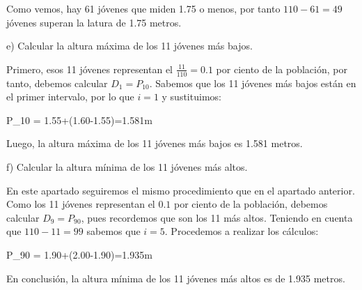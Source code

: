 Como vemos, hay 61 jóvenes que miden 1.75 o menos, por tanto $110-61=49$ jóvenes superan la latura de 1.75 metros.

e) Calcular la altura máxima de los 11 jóvenes más bajos.

Primero, esos 11 jóvenes representan el $\frac{11}{110}=0.1$ por ciento de la población, por tanto, debemos calcular $D_{1} = P_{10}$. Sabemos que los 11 jóvenes más bajos están en el primer intervalo, por lo que $i=1$ y sustituimos:

\begin{center}
    \begin{*gather}
        P_{10} = 1.55+(1.60-1.55)=1.581m
    \end{*gather}
\end{center}

Luego, la altura máxima de los 11 jóvenes más bajos es 1.581 metros.

f) Calcular la altura mínima de los 11 jóvenes más altos.

En este apartado seguiremos el mismo procedimiento que en el apartado anterior. Como los 11 jóvenes representan el $0.1$ por ciento de la población, debemos calcular $D_{9} = P_{90}$, pues recordemos que son los 11 más altos. Teniendo en cuenta que $110-11=99$ sabemos que $i=5$. Procedemos a realizar los cálculos:

\begin{center}
    \begin{*gather}
        P_{90} = 1.90+(2.00-1.90)=1.935m
    \end{*gather}
\end{center}

En conclusión, la altura mínima de los 11 jóvenes más altos es de 1.935 metros. 
